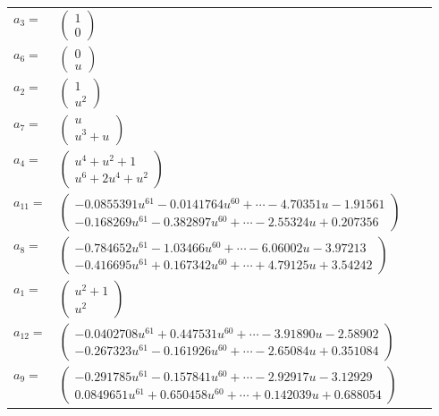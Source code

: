 \documentclass[1p]{elsarticle_modified}
\theoremstyle{definition}
\begin{document}
\begin{tabular}{m{7pt} m{180pt} m{7pt} m{180pt} }
\flushright $a_{3}=$&$\begin{pmatrix}1\\0\end{pmatrix}$ \\
\flushright $a_{6}=$&$\begin{pmatrix}0\\u\end{pmatrix}$ \\
\flushright $a_{2}=$&$\begin{pmatrix}1\\u^2\end{pmatrix}$ \\
\flushright $a_{7}=$&$\begin{pmatrix}u\\u^3+u\end{pmatrix}$ \\
\flushright $a_{4}=$&$\begin{pmatrix}u^4+u^2+1\\u^6+2 u^4+u^2\end{pmatrix}$ \\
\flushright $a_{11}=$&$\begin{pmatrix}-0.0855391 u^{61}-0.0141764 u^{60}+\cdots-4.70351 u-1.91561\\-0.168269 u^{61}-0.382897 u^{60}+\cdots-2.55324 u+0.207356\end{pmatrix}$ \\
\flushright $a_{8}=$&$\begin{pmatrix}-0.784652 u^{61}-1.03466 u^{60}+\cdots-6.06002 u-3.97213\\-0.416695 u^{61}+0.167342 u^{60}+\cdots+4.79125 u+3.54242\end{pmatrix}$ \\
\flushright $a_{1}=$&$\begin{pmatrix}u^2+1\\u^2\end{pmatrix}$ \\
\flushright $a_{12}=$&$\begin{pmatrix}-0.0402708 u^{61}+0.447531 u^{60}+\cdots-3.91890 u-2.58902\\-0.267323 u^{61}-0.161926 u^{60}+\cdots-2.65084 u+0.351084\end{pmatrix}$ \\
\flushright $a_{9}=$&$\begin{pmatrix}-0.291785 u^{61}-0.157841 u^{60}+\cdots-2.92917 u-3.12929\\0.0849651 u^{61}+0.650458 u^{60}+\cdots+0.142039 u+0.688054\end{pmatrix}$ \\

\end{tabular}
\end{document}
